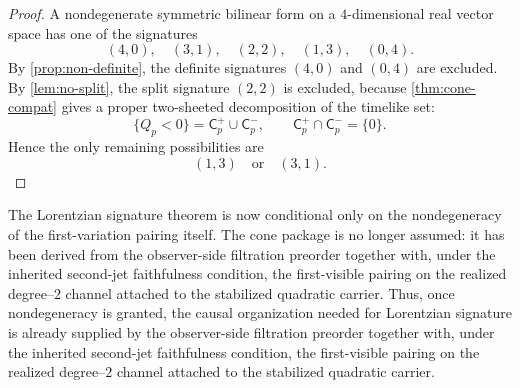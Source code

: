 \begin{proof}
	A nondegenerate symmetric bilinear form on a \(4\)-dimensional real
	vector space has one of the signatures
	\[
		(4,0),\quad (3,1),\quad (2,2),\quad (1,3),\quad (0,4).
	\]
	By \cref{prop:non-definite}, the definite signatures \((4,0)\) and
	\((0,4)\) are excluded.
	By \cref{lem:no-split}, the split signature \((2,2)\) is excluded,
	because \cref{thm:cone-compat} gives a proper two-sheeted decomposition
	of the timelike set:
	\[
		\{Q_p<0\}=\mathsf C_p^+\cup \mathsf C_p^-,
		\qquad
		\mathsf C_p^+\cap \mathsf C_p^-=\{0\}.
	\]
	Hence the only remaining possibilities are
	\[
		(1,3)\quad\text{or}\quad(3,1).
	\]
\end{proof}
\begin{remark}
	The Lorentzian signature theorem is now conditional only on the
	nondegeneracy of the first-variation pairing itself.  The cone package
	is no longer assumed: it has been derived from the observer-side
	filtration preorder together with, under the inherited second-jet faithfulness condition, the first-visible pairing on the realized
	degree--\(2\) channel attached to the stabilized quadratic carrier.
	Thus, once nondegeneracy is granted, the causal organization needed
	for Lorentzian signature is already supplied by the observer-side
	filtration preorder together with, under the inherited second-jet faithfulness condition, the first-visible pairing on the realized
	degree--\(2\) channel attached to the stabilized quadratic carrier.
\end{remark}

